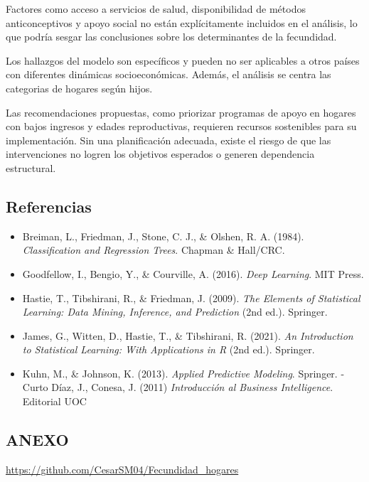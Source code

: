 \documentclass[
]{article}
\providecommand{\tightlist}{%
  \setlength{\itemsep}{0pt}\setlength{\parskip}{0pt}}
\begin{document}
Factores como acceso a servicios de salud, disponibilidad de métodos
anticonceptivos y apoyo social no están explícitamente incluidos en el
análisis, lo que podría sesgar las conclusiones sobre los determinantes
de la fecundidad.

Los hallazgos del modelo son específicos y pueden no ser aplicables a
otros países con diferentes dinámicas socioeconómicas. Además, el
análisis se centra las categorias de hogares según hijos.

Las recomendaciones propuestas, como priorizar programas de apoyo en
hogares con bajos ingresos y edades reproductivas, requieren recursos
sostenibles para su implementación. Sin una planificación adecuada,
existe el riesgo de que las intervenciones no logren los objetivos
esperados o generen dependencia estructural.

\subsection{Referencias}\label{referencias}

\begin{itemize}
\tightlist
\item
  Breiman, L., Friedman, J., Stone, C. J., \& Olshen, R. A. (1984).
  \emph{Classification and Regression Trees}. Chapman \& Hall/CRC.
\item
  Goodfellow, I., Bengio, Y., \& Courville, A. (2016). \emph{Deep
  Learning}. MIT Press.
\item
  Hastie, T., Tibshirani, R., \& Friedman, J. (2009). \emph{The Elements
  of Statistical Learning: Data Mining, Inference, and Prediction} (2nd
  ed.). Springer.
\item
  James, G., Witten, D., Hastie, T., \& Tibshirani, R. (2021). \emph{An
  Introduction to Statistical Learning: With Applications in R} (2nd
  ed.). Springer.
\item
  Kuhn, M., \& Johnson, K. (2013). \emph{Applied Predictive Modeling}.
  Springer. -Curto Díaz, J., Conesa, J. (2011) \emph{Introducción al
  Business Intelligence}. Editorial UOC
\end{itemize}

\subsection{ANEXO}\label{anexo}

\url{https://github.com/CesarSM04/Fecundidad_hogares}
\end{document}

